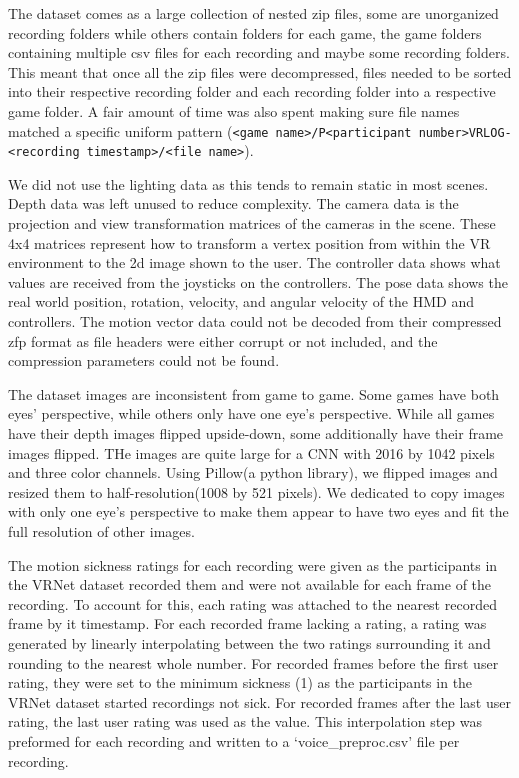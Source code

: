 The dataset comes as a large collection of nested zip files, some are unorganized recording folders while others contain folders for each game, the game folders containing multiple csv files for each recording and maybe some recording folders.
This meant that once all the zip files were decompressed, files needed to be sorted into their respective recording folder and each recording folder into a respective game folder.
A fair amount of time was also spent making sure file names matched a specific uniform pattern (\verb+<game name>/P<participant number>VRLOG-<recording timestamp>/<file name>+).

We did not use the lighting data as this tends to remain static in most scenes.
Depth data was left unused to reduce complexity.
The camera data is the projection and view transformation matrices of the cameras in the scene.
These 4x4 matrices represent how to transform a vertex position from within the VR environment to the 2d image shown to the user.
The controller data shows what values are received from the joysticks on the controllers.
The pose data shows the real world position, rotation, velocity, and angular velocity of the HMD and controllers.
The motion vector data could not be decoded from their compressed zfp format as file headers were either corrupt or not included, and the compression parameters could not be found.

The dataset images are inconsistent from game to game.
Some games have both eyes' perspective, while others only have one eye's perspective.
While all games have their depth images flipped upside-down, some additionally have their frame images flipped.
THe images are quite large for a CNN with 2016 by 1042 pixels and three color channels.
Using Pillow(a python library), we flipped images and resized them to half-resolution(1008 by 521 pixels).
We dedicated to copy images with only one eye's perspective to make them appear to have two eyes and fit the full resolution of other images.

The motion sickness ratings for each recording were given as the participants in the VRNet dataset recorded them and were not available for each frame of the recording.
To account for this, each rating was attached to the nearest recorded frame by it timestamp.
For each recorded frame lacking a rating, a rating was generated by linearly interpolating between the two ratings surrounding it and rounding to the nearest whole number.
For recorded frames before the first user rating, they were set to the minimum sickness (1) as the participants in the VRNet dataset started recordings not sick.
For recorded frames after the last user rating, the last user rating was used as the value.
This interpolation step was preformed for each recording and written to a `voice\_preproc.csv' file per recording.

